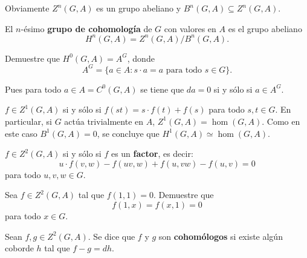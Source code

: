 Obviamente $Z^n(G,A)$ es un grupo abeliano y $B^n(G,A)\subseteq Z^n(G,A)$.

\begin{definition}
	El $n$-ésimo \textbf{grupo de cohomología} de $G$ con valores en $A$
	es el grupo abeliano
	\[
	H^n(G,A)=Z^n(G,A)/B^n(G,A).
	\]
\end{definition}

\begin{exercise}
	Demuestre que $H^0(G,A)=A^G$, donde 
	\[
	A^G=\{a\in A:s\cdot a=a\text{ para todo $s\in G$}\}. 
	\]
\end{exercise}

\begin{svgraybox}
	Pues para todo $a\in A=C^0(G,A)$ se tiene que $da=0$ si y sólo si $a\in
	A^G$.
\end{svgraybox}

\begin{example}
	$f\in Z^1(G,A)$ si y sólo si $f(st)=s\cdot f(t)+f(s)$ para todo $s,t\in G$.
	En particular, si $G$ actúa trivialmente en $A$, $Z^1(G,A)=\hom(G,A)$. Como
	en este caso $B^1(G,A)=0$, se concluye que $H^1(G,A)\simeq\hom(G,A)$. 
\end{example}

\begin{example}
	$f\in Z^2(G,A)$ si y sólo si $f$ es un \textbf{factor}, es decir:
	\begin{equation}
		\label{eq:2cociclo}
		u\cdot f(v,w)-f(uv,w)+f(u,vw)-f(u,v)=0
	\end{equation}
	para todo $u,v,w\in G$.
\end{example}

\begin{exercise}
	Sea $f\in Z^2(G,A)$ tal que $f(1,1)=0$. Demuestre que 
	\[
	f(1,x)=f(x,1)=0
	\]
	para todo $x\in G$.
\end{exercise}


\begin{definition}
	Sean $f,g\in Z^2(G,A)$. Se dice que $f$ y $g$ son \textbf{cohomólogos} si
	existe algún coborde $h$ tal que $f-g=dh$. 
\end{definition}

